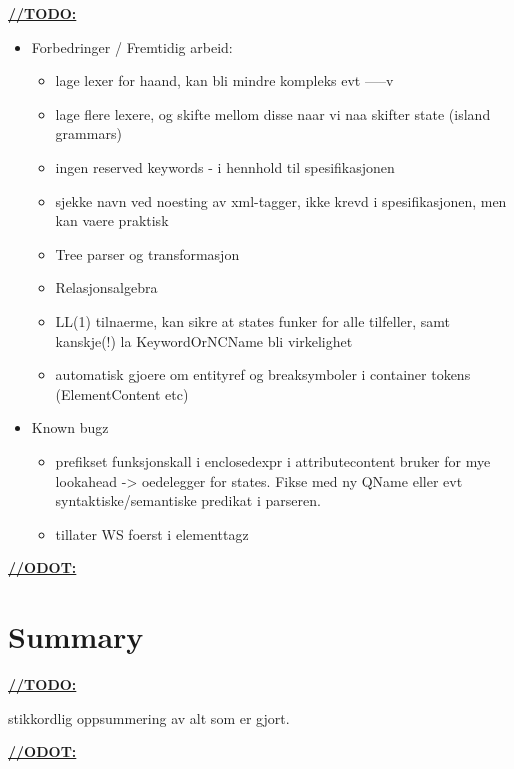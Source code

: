 \label{sect:summary:future_work}
\underline{\textbf{\LARGE //TODO:}}
\begin{itemize}
	\item Forbedringer / Fremtidig arbeid:
	\begin{itemize}
		\item lage lexer for haand, kan bli mindre kompleks evt -----v
		\item lage flere lexere, og skifte mellom disse naar vi naa skifter state (island grammars)
		\item ingen reserved keywords - i hennhold til spesifikasjonen
		\item sjekke navn ved noesting av xml-tagger, ikke krevd i spesifikasjonen, men kan vaere praktisk
		\item Tree parser og transformasjon
		\item Relasjonsalgebra
		\item LL(1) tilnaerme, kan sikre at states funker for alle tilfeller, samt kanskje(!) la KeywordOrNCName bli virkelighet
		\item automatisk gjoere om entityref og breaksymboler i container tokens (ElementContent etc)
	\end{itemize}

	\item Known bugz
	\begin{itemize}
		\item prefikset funksjonskall i enclosedexpr i attributecontent bruker for mye lookahead -> oedelegger for states. Fikse med ny QName eller evt syntaktiske/semantiske predikat i parseren.
		\item tillater WS foerst i elementtagz
	\end{itemize}
	
\end{itemize}

\underline{\textbf{\LARGE //ODOT:}}

\section{Summary}

\underline{\textbf{\LARGE //TODO:}}

stikkordlig oppsummering av alt som er gjort.

\underline{\textbf{\LARGE //ODOT:}}